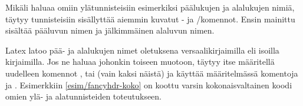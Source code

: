 \begin{koodilohkosis}
\renewcommand{\headrulewidth}{1bp} %
\renewcommand{\footrulewidth}{1bp} %
\end{koodilohkosis}

\noindent
Mikäli haluaa omiin ylätunnisteisiin esimerkiksi päälukujen ja
alalukujen nimiä, täytyy tunnisteisiin sisällyttää aiemmin kuvatut
- ja \-/komennot. Ensin mainittu
sisältää pääluvun nimen ja jälkimmäinen alaluvun nimen.

\begin{koodilohkosis}
\fancyhf[HEL]{\leftmark}
\fancyhf[HOR]{\rightmark}
\end{koodilohkosis}

\noindent
Latex latoo pää- ja alalukujen nimet oletuksena versaalikirjaimilla eli
isoilla kirjaimilla. Jos ne haluaa johonkin toiseen muotoon, täytyy itse
määritellä uudelleen komennot ,
 tai  (vain kaksi näistä)
ja käyttää määritelmässä komentoja  ja
. Esimerkkiin \ref{esim/fancyhdr-koko} on koottu
varsin kokonaisvaltainen koodi omien ylä- ja alatunnisteiden
toteutukseen.

